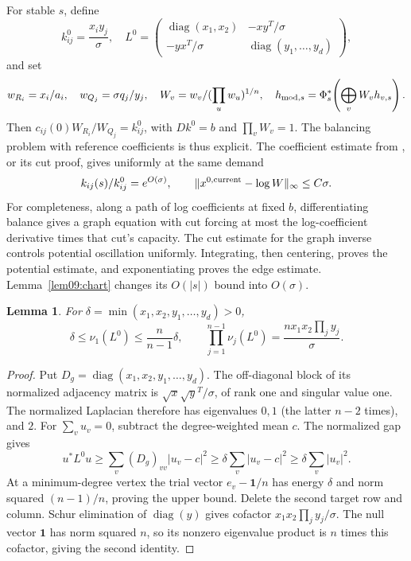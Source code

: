\documentclass[11pt]{amsart}
\newtheorem{lemma}[theorem]{Lemma}
\theoremstyle{definition}
\theoremstyle{remark}
\newcommand{\diag}{\operatorname{diag}}
\newcommand{\one}{\mathbf1}
\begin{document}
For stable \(s\), define
\begin{equation}\label{eq09:productgraph}
 k^0_{ij}=\frac{x_i y_j}{\sigma},\quad
 L^0=\begin{pmatrix}
 \diag(x_1,x_2)&-xy^T/\sigma\\
 -yx^T/\sigma&\diag(y_1,\ldots,y_d)
 \end{pmatrix},
\end{equation}
and set
\begin{equation}\label{eq09:weights}
 w_{R_i}=x_i/a_i,\quad w_{Q_j}=\sigma q_j/y_j,\quad
 W_v=w_v/(\prod_uw_u)^{1/n},\quad
 h_{{\rm mod},s}=\Phi_s^*\!\left(\bigoplus_vW_vh_{v,s}\right).
\end{equation}
Then \(c_{ij}(0)W_{R_i}/W_{Q_j}=k^0_{ij}\), with
\(Dk^0=b\) and \(\prod_vW_v=1\).
The balancing problem with reference coefficients is thus explicit. The coefficient estimate
from \cite[Proposition~2.3]{wuebben2026uniform}, or its cut proof,
gives uniformly at the same demand
\begin{equation}\label{eq09:freeze}
 k_{ij}(s)/k^0_{ij}=e^{O(\sigma)},\qquad
 \|x^{0,\rm current}-\log W\|_\infty\le C\sigma.
\end{equation}
For completeness, along a path of log coefficients at fixed \(b\),
differentiating balance gives a graph equation with cut forcing at
most the log-coefficient derivative times that cut's capacity.
The cut estimate for the graph inverse controls potential
oscillation uniformly. Integrating,
then centering, proves the potential estimate, and exponentiating
proves the edge estimate. Lemma~\ref{lem09:chart} changes its
\(O(|s|)\) bound into \(O(\sigma)\).

\begin{lemma}\label{lem09:finite}
For \(\delta=\min(x_1,x_2,y_1,\ldots,y_d)>0\),
\begin{equation}\label{eq09:finite}
 \delta\le\nu_1(L^0)\le\frac n{n-1}\delta,\qquad
 \prod_{j=1}^{n-1}\nu_j(L^0)
       =\frac{n x_1x_2\prod_jy_j}{\sigma}.
\end{equation}
\end{lemma}

\begin{proof}
Put \(D_g=\diag(x_1,x_2,y_1,\ldots,y_d)\). The off-diagonal
block of its normalized adjacency matrix is
\(\sqrt x\sqrt y^T/\sigma\), of rank one and singular value
one. The normalized Laplacian therefore has eigenvalues
\(0,1\) (the latter \(n-2\) times), and \(2\).
For \(\sum_vu_v=0\), subtract the degree-weighted mean \(c\).
The normalized gap gives
\[
 u^*L^0u\ge\sum_v(D_g)_{vv}|u_v-c|^2
   \ge\delta\sum_v|u_v-c|^2\ge\delta\sum_v|u_v|^2.
\]
At a minimum-degree vertex the trial vector \(e_v-\one/n\)
has energy \(\delta\) and norm squared \((n-1)/n\), proving
the upper bound. Delete the second target row and column.
Schur elimination of \(\diag(y)\) gives cofactor
\(x_1x_2\prod_jy_j/\sigma\). The null vector \(\one\) has
norm squared \(n\), so its nonzero eigenvalue product is \(n\)
times this cofactor, giving the second identity.
\end{proof}
\end{document}
